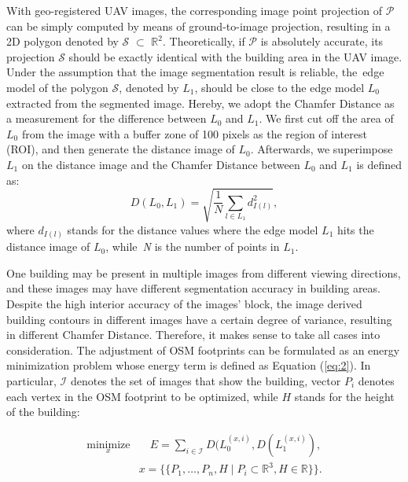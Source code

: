 \documentclass[remotesensing,article,accept,moreauthors,pdftex,10pt,a4paper]{mdpi}
\theoremstyle{mdpi}
\newcounter{ex}
\newcounter{re}
\newcommand{\icol}[1]{%
  \left(\begin{smallmatrix}#1\end{smallmatrix}\right)%
}
\begin{document}
With geo-registered UAV images, the corresponding image point projection of $\mathscr{P}$ can be simply computed by means of ground-to-image projection, resulting in a 2D polygon denoted by $\mathscr{S}$ $\subset$ $\mathbb{R}^2$. 
Theoretically, if $\mathscr{P}$ is absolutely accurate, its projection $\mathscr{S}$ should be exactly identical with the building area in the UAV image. Under the assumption that the image segmentation result is reliable, the~edge model of the polygon $\mathscr{S}$, denoted by $L_1$, should be close to the edge model $L_0$ extracted from the segmented image. Hereby, we adopt the Chamfer Distance \cite{BORGEFORS1986distance} as a measurement for the difference between $L_0$ and $L_1$. We first cut off the area of $L_0$ from the image with a buffer zone of 100 pixels as the region of interest (ROI), and then generate the distance image of $L_0$. Afterwards, we superimpose $L_1$ on the distance image and the Chamfer Distance between $L_0$ and $L_1$ is defined as:
\begin{equation} \label{eq:1}
D(L_0,L_1) = \sqrt{\frac{1}{N} \sum_{l\in L_1}^{} d_{I(l)}^2},
\end{equation}
where $d_{I(l)}$ stands for the distance values where the edge model $L_1$ hits the distance image of $L_0$, while~\emph{N} is the number of points in $L_1$. 

One building may be present in multiple images from different viewing directions, and these images may have different segmentation accuracy in building areas. Despite the high interior accuracy of the images' block, the image derived building contours in different images have a certain degree of variance, resulting in different Chamfer Distance. Therefore, it makes sense to take all cases into consideration. The adjustment of OSM footprints can be formulated as an energy minimization problem whose energy term is defined as Equation (\ref{eq:2}). In particular, $\mathscr{I}$ denotes the set of images that show the building, vector $P_{i}$ denotes each vertex in the OSM footprint to be optimized, while $H$ stands for the height of the building:

\begin{equation} \label{eq:2}
\begin{split}
 \underset{x}{\text{minimize}}  
& \quad E = \sum_{i\in \mathscr{I}^{}} D(L_{0}^{(x, i)}, D(L_{1}^{(x, i)}),\\
& x = \{\{ P_{1},  \ldots ,  P_{n}, H \mid  P_{i} \subset \mathbb{R}^3, H \in \mathbb{R}  \}\}.
\end{split}
\end{equation}
\end{document}
